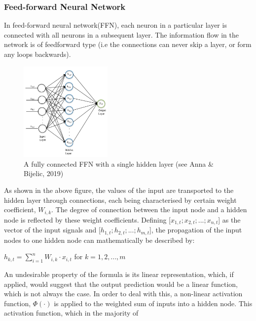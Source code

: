 \documentclass[a4paper,11pt,oneside]{book}
\begin{document}
 \subsubsection{Feed-forward Neural Network}
 In feed-forward neural network(FFN), each neuron in a
 particular layer is connected with all neurons in a subsequent layer. The information
 flow in the network is of feedforward type (i.e the connections
 can never skip a layer, or form any loops backwards).\newline
 \begin{figure}
 	\centering
 	\includegraphics[width=0.4\textwidth]{figures/FFN}
 	\caption{A fully connected FFN with a single hidden layer (see Anna \& Bijelic, 2019)}
 	
 	\label{sixthfig}
 \end{figure}
\newline
 As shown in the above figure, the values of the input are transported to the hidden layer through connections, each being characterised by certain weight coefficient, $W_{i,k}$. The degree of connection between the input node and a hidden node is reflected by these weight coefficients. Defining [$x_{1,t};x_{2,t};...;x_{n,t}$] as the vector of the input signals and [$h_{1,t};h_{2,t};...;h_{m,t}$], the propagation of the input nodes to one hidden node can
 mathematically be described by: \newline
 \begin{center}


 $h_{k,t} =\sum_{i=1}^{n} W_{i,k} \cdot x_{i,t}$ for $k = 1,2,...,m$
  \end{center}
An undesirable property of the formula is its linear representation,
which, if applied, would suggest that the output prediction would be a linear function, which is not always the case. In order to deal with this, a non-linear activation function, $\Phi(\cdot)$ is applied to the weighted sum of
inputs into a hidden node. This activation function, which in the majority of
\end{document}
